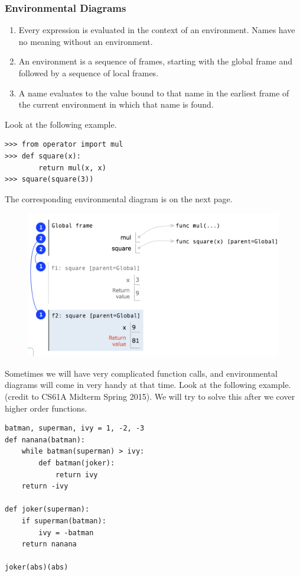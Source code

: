 \documentclass[11pt]{article}
\begin{document}
\subsubsection{Environmental Diagrams} 
\begin{enumerate}
\item Every expression is evaluated in the context of an environment. Names have no meaning without an environment. 
\item An environment is a sequence of frames, starting with the global frame and followed by a sequence of local frames.
\item A name evaluates to the value bound to that name in the earliest frame of the current environment in which that name is found. 
\end{enumerate}
Look at the following example. 
\begin{lstlisting}
>>> from operator import mul
>>> def square(x):
		return mul(x, x)
>>> square(square(3))
\end{lstlisting} 
The corresponding environmental diagram is on the next page.\\
\begin{figure}[h!]
\includegraphics[width=\linewidth]{Lec3.png}
\end{figure}
\newline
Sometimes we will have very complicated function calls, and environmental diagrams will come in very handy at that time. Look at the following example. (credit to CS61A Midterm Spring 2015). We will try to solve this after we cover higher order functions. 
\begin{lstlisting}
batman, superman, ivy = 1, -2, -3 
def nanana(batman):
	while batman(superman) > ivy: 
		def batman(joker):
			return ivy
	return -ivy

def joker(superman):
	if superman(batman):
		ivy = -batman
	return nanana
	
joker(abs)(abs)
\end{lstlisting}
\end{document}
